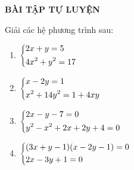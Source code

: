 \begin{center}
\textbf{BÀI TẬP TỰ LUYỆN}
\end{center}
\begin{bt}%
Giải các hệ phương trình sau:
\begin{multicols}{2}
	\begin{enumerate}
		\item $\left\{\begin{aligned}&2x+y=5\\&4x^2+y^2=17\end{aligned}\right.$
		\item $\left\{\begin{aligned}&x-2y=1\\&x^2+14y^2=1+4xy\end{aligned}\right.$
		\item $\left\{\begin{aligned}&2x-y-7=0\\&y^2-x^2+2x+2y+4=0\end{aligned}\right.$
		\item $\left\{\begin{aligned}&(3x+y-1)(x-2y-1)=0\\&2x-3y+1=0\end{aligned}\right.$
	\end{enumerate}
\end{multicols}
\end{bt}

